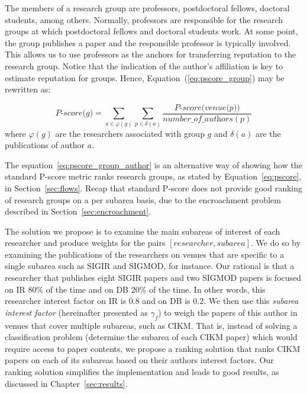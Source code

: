 \documentclass[msc]{ppgccufmg}
\begin{document}
The members of a research group are professors, postdoctoral fellows, doctoral students, among others. Normally, professors are responsible for the research groups at which postdoctoral fellows and doctoral students work. At some point, the group publishes a paper and the responsible professor is typically involved. This allows us to use professors as the anchors for transferring reputation to the research group. Notice that the indication of the author's affiliation is key to estimate reputation for groups. Hence, Equation~(\ref{eq:pscore_group}) may be rewritten as:

\begin{equation}\label{eq:pscore_group_author}
    \textit{P-score($g$)} = \sum_{a \in \varphi(g)} \sum_{p \in \delta(a)}  \frac{\textit{P-score(venue(p))}}{\textit{number\_of\_ authors}(p)}
\end{equation}
where $\varphi(g)$ are the researchers associated with group $g$ and $\delta(a)$ are the publications of author $a$. 

The equation~\ref{eq:pscore_group_author} is an alternative way of showing how the standard P-score metric ranks research groups, as stated by Equation~\ref{eq:pscore}, in Section~\ref{sec:flows}. Recap that standard P-score does not provide good ranking of research groups on a per subarea basis, due to the encroachment problem described in Section~\ref{sec:encroachment}. 

The solution we propose is to examine the main subareas of interest of each researcher and produce weights for the pairs $[researcher, subarea]$. We do so by examining the publications of the researchers on venues that are specific to a single subarea such as SIGIR and SIGMOD, for instance. Our rational is that a researcher that publishes eight SIGIR papers and two SIGMOD papers is focused on IR $80\%$ of the time and on DB 20\% of the time. 
%
In other words, this researcher interest factor on IR is 0.8 and on DB is 0.2. We then use this \textit{subarea interest factor} (hereinafter presented as $\gamma_{f}$) to weigh the papers of this author in venues that cover multiple subareas, such as CIKM. That is, instead of solving a classification problem (determine the subarea of each CIKM paper) which would require access to paper contents, we propose a ranking solution that ranks CIKM papers on each of its subareas based on their authors interest factors. Our ranking solution simplifies the implementation and leads to good results, as discussed in Chapter~\ref{sec:results}.
\end{document}
